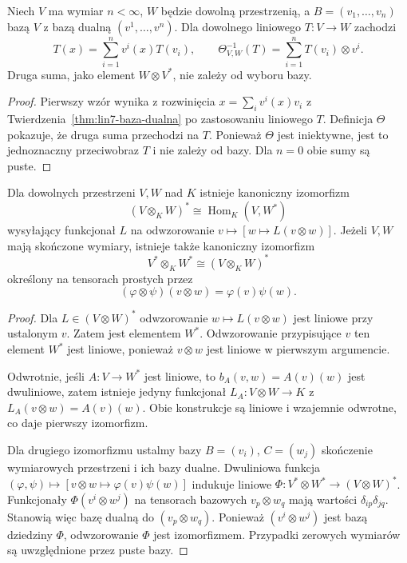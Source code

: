 \begin{wniosek}
\label{cor:lin9-hom-rozwiniecie}
Niech \(V\) ma wymiar \(n<\infty\),
\(W\) będzie dowolną przestrzenią,
a \(B=(v_1,\ldots,v_n)\)
bazą \(V\) z bazą dualną
\((v^1,\ldots,v^n)\).
Dla dowolnego liniowego
\(T\colon V\to W\) zachodzi
\[
 T(x)=\sum_{i=1}^n v^i(x)T(v_i),
 \qquad
 \Theta_{V,W}^{-1}(T)
 =\sum_{i=1}^n T(v_i)\otimes v^i.
\]
Druga suma, jako element
\(W\otimes V^*\), nie zależy
od wyboru bazy.
\end{wniosek}
\begin{proof}
Pierwszy wzór wynika z
rozwinięcia
\(x=\sum_i v^i(x)v_i\)
z
Twierdzenia~\ref{thm:lin7-baza-dualna}
po zastosowaniu liniowego \(T\).
Definicja \(\Theta\) pokazuje,
że druga suma przechodzi
na \(T\). Ponieważ
\(\Theta\) jest iniektywne,
jest to jednoznaczny przeciwobraz
\(T\) i nie zależy od bazy.
Dla \(n=0\) obie sumy są puste.
\end{proof}

\begin{twierdzenie}
\label{thm:lin9-dual}
Dla dowolnych przestrzeni
\(V,W\) nad \(K\) istnieje
kanoniczny izomorfizm
\[
 (V\otimes_KW)^*
 \cong\operatorname{Hom}_K(V,W^*)
\]
wysyłający funkcjonał \(L\)
na odwzorowanie
\(v\mapsto[w\mapsto L(v\otimes w)]\).
Jeżeli \(V,W\) mają skończone
wymiary, istnieje także
kanoniczny izomorfizm
\[
 V^*\otimes_KW^*
 \cong (V\otimes_KW)^*
\]
określony na tensorach prostych
przez
\[
 (\varphi\otimes\psi)(v\otimes w)
 =\varphi(v)\psi(w).
\]
\end{twierdzenie}
\begin{proof}
Dla \(L\in(V\otimes W)^*\)
odwzorowanie \(w\mapsto L(v\otimes w)\)
jest liniowe przy ustalonym \(v\).
Zatem jest elementem \(W^*\).
Odwzorowanie przypisujące \(v\)
ten element \(W^*\) jest liniowe,
ponieważ \(v\otimes w\)
jest liniowe w pierwszym argumencie.

Odwrotnie, jeśli \(A\colon V\to W^*\)
jest liniowe, to
\(b_A(v,w)=A(v)(w)\)
jest dwuliniowe, zatem istnieje
jedyny funkcjonał
\(L_A\colon V\otimes W\to K\)
z \(L_A(v\otimes w)=A(v)(w)\).
Obie konstrukcje są liniowe
i wzajemnie odwrotne,
co daje pierwszy izomorfizm.

Dla drugiego izomorfizmu
ustalmy bazy \(B=(v_i)\),
\(C=(w_j)\) skończenie
wymiarowych przestrzeni
i ich bazy dualne.
Dwuliniowa funkcja
\((\varphi,\psi)\mapsto
[v\otimes w\mapsto\varphi(v)\psi(w)]\)
indukuje liniowe
\(\Phi\colon V^*\otimes W^*\to
(V\otimes W)^*\).
Funkcjonały
\(\Phi(v^i\otimes w^j)\)
na tensorach bazowych
\(v_p\otimes w_q\)
mają wartości
\(\delta_{ip}\delta_{jq}\).
Stanowią więc bazę dualną
do \((v_p\otimes w_q)\).
Ponieważ \((v^i\otimes w^j)\)
jest bazą dziedziny \(\Phi\),
odwzorowanie \(\Phi\)
jest izomorfizmem.
Przypadki zerowych wymiarów
są uwzględnione przez puste bazy.
\end{proof}

